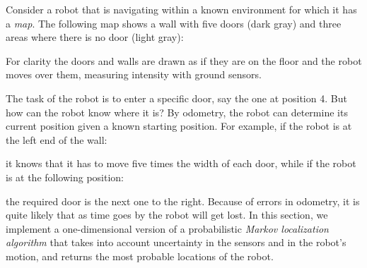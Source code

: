 Consider a robot that is navigating within a known environment for which it has a \emph{map}. The following map shows a wall with five doors (dark gray) and three areas where there is no door (light gray):

\begin{center}
\end{center}

For clarity the doors and walls are drawn as if they are on the floor and the robot moves over them, measuring intensity with ground sensors.

The task of the robot is to enter a specific door, say the one at position 4. But how can the robot know where it is? By odometry, the robot can determine its current position given a known starting position. For example, if the robot is at the left end of the wall:
\begin{center}
\end{center}
it knows that it has to move five times the width of each door, while if the robot is at the following position:
\begin{center}
\end{center}
the required door is the next one to the right. Because of errors in odometry, it is quite likely that as time goes by the robot will get lost. In this section, we implement a one-dimensional version of a probabilistic \emph{Markov localization algorithm} that takes into account uncertainty in the sensors and in the robot's motion, and returns the most probable locations of the robot.

